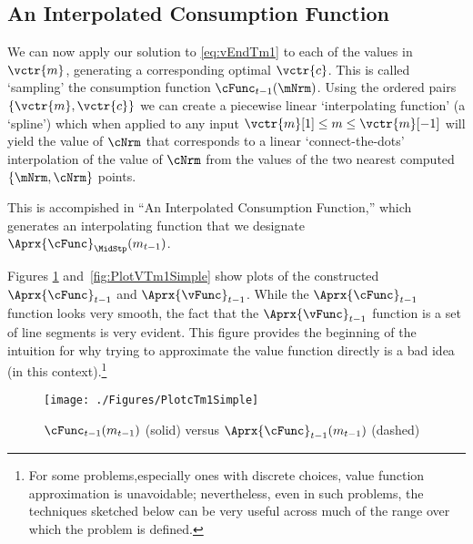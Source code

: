 \documentclass[SolvingMicroDSOPs]{subfiles}
\begin{document}
\hypertarget{an-interpolated-consumption-function}{}
\subsection{An Interpolated Consumption Function} \label{subsec:LinInterp}

We can now apply our solution to \eqref{eq:vEndTm1} to each of the values in $\vctr{m}$, generating a corresponding optimal $\vctr{c}$.  This is called `sampling' the consumption function $\cFunc_{\prdT-1}(\mNrm)$.  Using the ordered pairs $\{\vctr{m},\vctr{c}\}$ we can create a piecewise linear `interpolating function' (a `spline') which when applied to any input $\vctr{m}[1] \leq {m} \leq \vctr{m}[-1]$ will yield the value of $\cNrm$ that corresponds to a linear `connect-the-dots' interpolation of the value of $\cNrm$ from the values of the two nearest computed $\{\mNrm,\cNrm\}$ points.

This is accompished in ``An Interpolated Consumption Function,'' which generates an interpolating function that we designate $\Aprx{\cFunc}_{\MidStp}({m}_{\prdT-1})$. %

Figures \ref{fig:PlotcTm1Simple} and~\ref{fig:PlotVTm1Simple} show
plots of the constructed $\Aprx{\cFunc}_{\prdT-1}$ and $\Aprx{\vFunc}_{\prdT-1}$. While the $\Aprx{\cFunc}_{\prdT-1}$ function looks very smooth, the fact that the $\Aprx{\vFunc}_{\prdT-1}$ function is a set of line segments is very evident.  This figure provides the beginning of the intuition for why trying to approximate the value function directly is a bad idea (in this context).\footnote{For some problems,especially ones with discrete choices, value function approximation is unavoidable; nevertheless, even in such problems, the techniques sketched below can be very useful across much of the range over which the problem is defined.}

\hypertarget{PlotcTm1Simple}{}
\begin{figure}
  \centerline{\texttt{[image: ./Figures/PlotcTm1Simple]}}
  \caption{$\cFunc_{\prdT-1}({m}_{\prdT-1})$ (solid) versus $\Aprx{\cFunc}_{\prdT-1}({m}_{\prdT-1})$ (dashed)}
  \label{fig:PlotcTm1Simple}
\end{figure}
\end{document}
